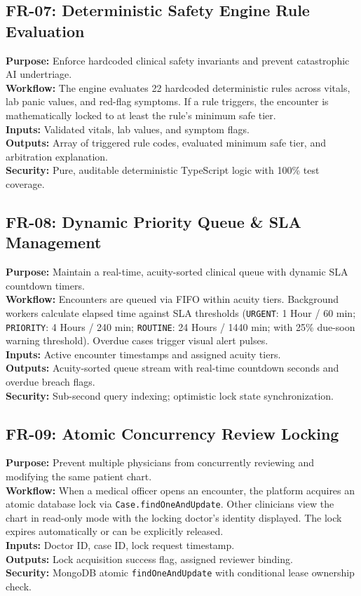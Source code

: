 \documentclass[11pt,a4paper,oneside]{report}
\begin{document}
\subsection{FR-07: Deterministic Safety Engine Rule Evaluation}
\textbf{Purpose:} Enforce hardcoded clinical safety invariants and prevent catastrophic AI undertriage.\\
\textbf{Workflow:} The engine evaluates 22 hardcoded deterministic rules across vitals, lab panic values, and red-flag symptoms. If a rule triggers, the encounter is mathematically locked to at least the rule's minimum safe tier.\\
\textbf{Inputs:} Validated vitals, lab values, and symptom flags.\\
\textbf{Outputs:} Array of triggered rule codes, evaluated minimum safe tier, and arbitration explanation.\\
\textbf{Security:} Pure, auditable deterministic TypeScript logic with 100\% test coverage.

\subsection{FR-08: Dynamic Priority Queue \& SLA Management}
\textbf{Purpose:} Maintain a real-time, acuity-sorted clinical queue with dynamic SLA countdown timers.\\
\textbf{Workflow:} Encounters are queued via FIFO within acuity tiers. Background workers calculate elapsed time against SLA thresholds (\texttt{URGENT}: 1 Hour / 60 min; \texttt{PRIORITY}: 4 Hours / 240 min; \texttt{ROUTINE}: 24 Hours / 1440 min; with 25\% due-soon warning threshold). Overdue cases trigger visual alert pulses.\\
\textbf{Inputs:} Active encounter timestamps and assigned acuity tiers.\\
\textbf{Outputs:} Acuity-sorted queue stream with real-time countdown seconds and overdue breach flags.\\
\textbf{Security:} Sub-second query indexing; optimistic lock state synchronization.

\subsection{FR-09: Atomic Concurrency Review Locking}
\textbf{Purpose:} Prevent multiple physicians from concurrently reviewing and modifying the same patient chart.\\
\textbf{Workflow:} When a medical officer opens an encounter, the platform acquires an atomic database lock via \texttt{Case.findOneAndUpdate}. Other clinicians view the chart in read-only mode with the locking doctor's identity displayed. The lock expires automatically or can be explicitly released.\\
\textbf{Inputs:} Doctor ID, case ID, lock request timestamp.\\
\textbf{Outputs:} Lock acquisition success flag, assigned reviewer binding.\\
\textbf{Security:} MongoDB atomic \texttt{findOneAndUpdate} with conditional lease ownership check.
\end{document}
